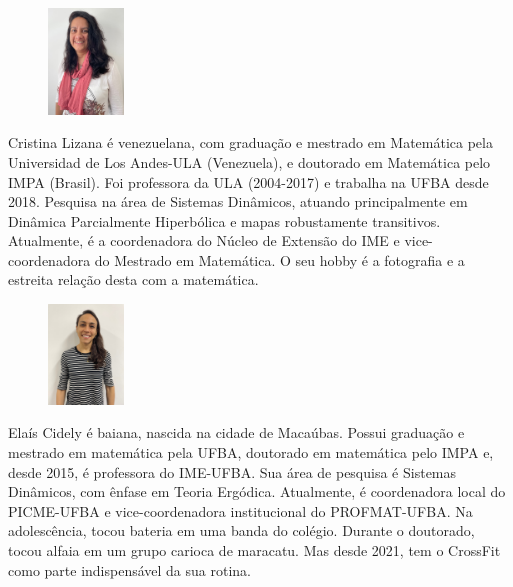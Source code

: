 \documentclass{hipatia}
\begin{document}
\vfill\eject
\begin{figure}
	\vspace{-10pt}
	\includegraphics[width=2cm]{Cristina.jpg}
\end{figure}\noindent  
Cristina Lizana é venezuelana, com graduação e mestrado em Matemática 
pela Universidad de Los Andes-ULA (Venezuela), e doutorado em Matemática pelo IMPA (Brasil).
Foi professora da ULA (2004-2017) e trabalha na UFBA desde 2018. Pesquisa na área de 
Sistemas Dinâmicos, atuando principalmente em Dinâmica Parcialmente Hiperbólica 
e mapas robustamente transitivos. Atualmente, é a coordenadora do Núcleo de Extensão do IME e vice-coordenadora do Mestrado em Matemática. O seu hobby é a fotografia e a estreita relação desta com a matemática.

\vspace{1cm}
\begin{figure}
	\vspace{-10pt}
	\includegraphics[width=2cm]{Elais.jpg}
\end{figure}\noindent 
Elaís Cidely é baiana, nascida na cidade de Macaúbas. Possui graduação e mestrado em matemática pela UFBA, doutorado em matemática pelo IMPA e, desde 2015, é professora do IME-UFBA. Sua área de pesquisa é Sistemas Dinâmicos, com ênfase em Teoria Ergódica. Atualmente, é coordenadora local do PICME-UFBA e vice-coordenadora institucional do PROFMAT-UFBA. Na adolescência,  tocou bateria em uma banda do colégio. Durante o doutorado, tocou alfaia em um grupo carioca de maracatu. Mas desde 2021, tem o CrossFit como parte indispensável da sua rotina.
\end{document}
